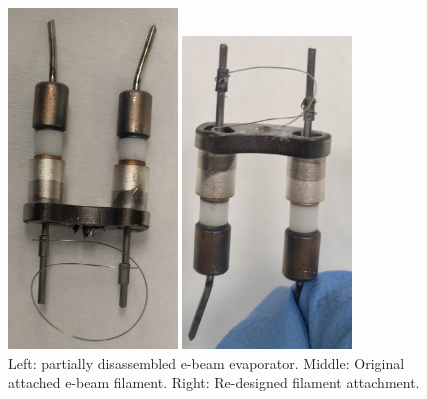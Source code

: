 \begin{figure}[H]
\begin{minipage}[b]{0.33\linewidth}
	\centering
	\includegraphics[width=0.4\textwidth]{filament.jpg}  %
\end{minipage}\hfill
\begin{minipage}[b]{0.33\linewidth}
	\centering
	\includegraphics[width=0.4\textwidth]{filament_new_design.jpg}  %
\end{minipage}\hfill
	\caption{Left: partially disassembled e-beam evaporator. Middle: Original attached e-beam filament. Right: Re-designed filament attachment.}
	\label{fig:filament}
\end{figure}

